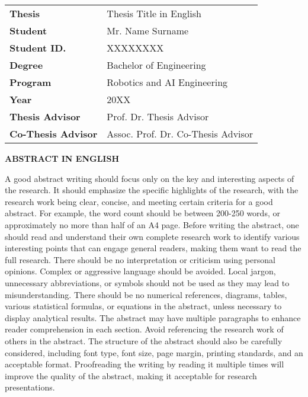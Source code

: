 
\noindent
\begin{tabular}{ll}
\textbf{Thesis} & Thesis Title in English \\
\textbf{Student} & Mr. Name Surname \\
\textbf{Student ID.} & XXXXXXXX \\
\textbf{Degree} & Bachelor of Engineering \\
\textbf{Program} & Robotics and AI Engineering \\
\textbf{Year} & 20XX \\
\textbf{Thesis Advisor} & Prof. Dr. Thesis Advisor \\
\textbf{Co-Thesis Advisor} & Assoc. Prof. Dr. Co-Thesis Advisor \\
\end{tabular}

\vspace{1cm}

\begin{center}
\textbf{\Large ABSTRACT IN ENGLISH}
\end{center}

\vspace{0cm}

A good abstract writing should focus only on the key and interesting aspects of
the research. It should emphasize the specific highlights of the research, with the
research work being clear, concise, and meeting certain criteria for a good abstract. For
example, the word count should be between 200-250 words, or approximately no
more than half of an A4 page. Before writing the abstract, one should read and
understand their own complete research work to identify various interesting points
that can engage general readers, making them want to read the full research. There
should be no interpretation or criticism using personal opinions. Complex or aggressive
language should be avoided. Local jargon, unnecessary abbreviations, or symbols
should not be used as they may lead to misunderstanding. There should be no
numerical references, diagrams, tables, various statistical formulas, or equations in the
abstract, unless necessary to display analytical results.
The abstract may have multiple paragraphs to enhance reader comprehension
in each section. Avoid referencing the research work of others in the abstract. The
structure of the abstract should also be carefully considered, including font type, font
size, page margin, printing standards, and an acceptable format. Proofreading the
writing by reading it multiple times will improve the quality of the abstract, making it
acceptable for research presentations.